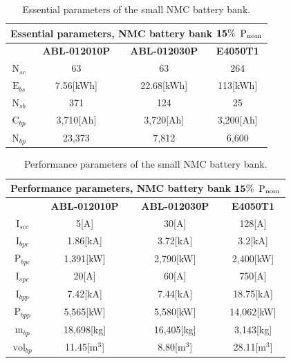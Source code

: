 \begin{table}[H]
	\centering
	\caption{Essential parameters of the small NMC battery bank.}
	\label{tab:NMC_015_1}
	\begin{tabular}{|c|c|c|c|}
		\hline
		\multicolumn{4}{|c|}{\textbf{Essential parameters, NMC battery bank} $\bf 15\%$ ${\bf \text{P}}_{\bf \text{nom}}$} \\
		\hline\hline
		 &  \textbf{ABL-012010P} & \textbf{ABL-012030P} & \textbf{E4050T1}\\
		 \hline
		$\text{N}_{sc}$ & 63  & 63 & 264 \\	
		\hline
		$\text{E}_{bs}$ &  7.56[kWh] & 22.68[kWh] & 113[kWh]\\	
		\hline
		$\text{N}_{sb}$ &  371 & 124 & 25\\	
		\hline
		$\text{C}_{bp}$ & 3,710[Ah]& 3,720[Ah] & 3,200[Ah]\\	
		\hline
		$\text{N}_{bp}$ & 23,373 & 7,812 &   6,600  \\	
		\hline		
	\end{tabular}
\end{table}

\begin{table}[H]
	\centering
	\caption{Performance parameters of the small NMC battery bank.}
	\label{tab:NMC_015_2}
	\begin{tabular}{|c|c|c|c|}
		\hline
		\multicolumn{4}{|c|}{\textbf{Performance parameters, NMC battery bank} $\bf 15\%$ ${\bf \text{P}}_{\bf \text{nom}}$} \\
		\hline\hline
		 &  \textbf{ABL-012010P} & \textbf{ABL-012030P} & \textbf{E4050T1}\\
		 \hline
		$\text{I}_{scc}$ & 5[A]  & 30[A] & 128[A] \\	
		\hline
		$\text{I}_{bpc}$ &  1.86[kA] & 3.72[kA] & 3.2[kA]\\	
		\hline
		$\text{P}_{bpc}$ &   1,391[kW] & 2,790[kW] &   2,400[kW]  \\	
		\hline
		$\text{I}_{spc}$ & 20[A] & 60[A] & 750[A] \\	
		\hline
		$\text{I}_{bpp}$ & 7.42[kA] & 7.44[kA] & 18.75[kA]  \\	
		\hline
		$\text{P}_{bpp}$ & 5,565[kW] & 5,580[kW] & 14,062[kW]  \\	
		\hline		
		$\text{m}_{bp}$ & 18,698[kg]  & 16,405[kg] & 3,143[kg] \\	
		\hline
		$\text{vol}_{bp}$ &  11.45[${\text{m}}^{3}$] & 8.80[${\text{m}}^{3}$] & 28.11[${\text{m}}^{3}$]\\	
		\hline
	\end{tabular}
\end{table}



